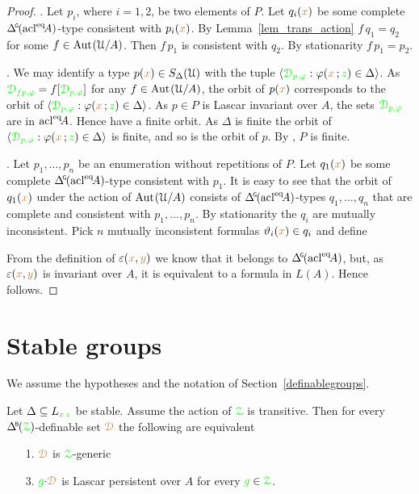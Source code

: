 \begin{proof}
  .
  Let $p_i$, where $i=1,2$, be two elements of $P$.
  Let $q_i({\color{brown} x})$ be some complete $\GDelta(\acl^\eq\!A)$-type consistent with $p_i({\color{brown} x})$.
  By Lemma~\ref{lem_trans_action} $f\,q_1=q_2$ for some $f\in{\rm Aut\kern.15ex}(\EuScript U/A)$.
  Then $f\,p_1$ is consistent with $q_2$.
  By stationarity $f\,p_1=p_2$.

  .
  We may identify a type $p({\color{brown} x})\in S_\Delta(\EuScript U)$ with the tuple $\langle{\color{green}\EuScript D_{p,\varphi}}:\varphi({\color{brown} x}\,;{\color{green} z})\in\Delta\rangle$.
  As ${\color{green}\EuScript D_{fp,\varphi}}=f[{\color{green}\EuScript D_{p,\varphi}}]$ for any $f\in{\rm Aut\kern.15ex}(\EuScript U/A)$, the orbit of $p({\color{brown} x})$ corresponds to the orbit of $\langle{\color{green}\EuScript D_{p,\varphi}}:\varphi({\color{brown} x}\,;{\color{green} z})\in\Delta\rangle$.
  As $p\in P$ is Lascar invariant over $A$, the sets ${\color{green}\EuScript D_{p,\varphi}}$ are in ${\rm acl}^{{\rm eq}}\!A$.
  Hence have a finite orbit.
  As $\Delta$ is finite the orbit of $\langle{\color{green}\EuScript D_{p,\varphi}}:\varphi({\color{brown} x}\,;{\color{green} z})\in\Delta\rangle$ is finite, and so is the orbit of $p$.
  By , $P$ is finite.

  . 
  Let $p_1,\dots,p_n$ be an enumeration without repetitions of $P$.
  Let $q_1({\color{brown} x})$ be some complete $\GDelta(\acl^\eq\!A)$-type consistent with $p_1$.
  It is easy to see that the orbit of $q_1({\color{brown} x})$ under the action of ${\rm Aut\kern.15ex}(\EuScript U/A)$ consists of $\GDelta(\acl^\eq\!A)$-types $q_1,\dots,q_n$ that are complete and consistent with $p_1,\dots,p_n$.
  By stationarity the $q_i$ are mutually inconsistent.
  Pick $n$ mutually inconsistent formulas $\vartheta_i({\color{brown} x})\in q_i$ and define

  
  From the definition of $\varepsilon({\color{brown} x},{\color{brown} y})$ we know that it belongs to $\GDelta(\acl^\eq\!A)$, but, as $\varepsilon({\color{brown} x},{\color{brown} y})$ is invariant over $A$, it is equivalent to a formula in $L(A)$.
  Hence  follows.
\end{proof}

\section{Stable groups}\label{stable_groups}

We assume the hypotheses and the notation of Section~\ref{definablegroups}.

\begin{theorem}\label{thm_Ggeneric_persistent}
  Let $\Delta\subseteq L_{{\color{brown} x}\,{\color{green} z}}$ be stable.
  Assume the action of ${\color{green}\EuScript Z}$ is transitive.
  Then for every $\BDelta(\grZ)$-definable set ${\color{brown}\EuScript D}$ the following are equivalent
  \begin{itemize}
    \item [1.] ${\color{brown}\EuScript D}$ is ${\color{green}\EuScript Z}$-generic
    \item [3.] ${\color{green} g}{\cdot}{\color{brown}\EuScript D}$ is Lascar persistent over $A$ for every ${\color{green} g}\in{\color{green}\EuScript Z}$.
  \end{itemize}
\end{theorem}


